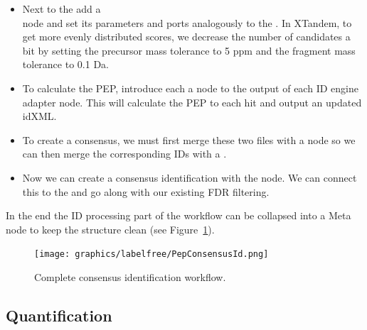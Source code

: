 \begin{itemize}
\item
Next to the  add a  \\
 node and set its parameters and ports analogously to the . In XTandem, to get more evenly distributed scores, we decrease the number of candidates a bit by setting the precursor mass tolerance to 5 ppm and the fragment mass tolerance to 0.1 Da.
\item
To calculate the PEP, introduce each a   node to the output of each ID engine adapter node.
This will calculate the PEP to each hit and output an updated idXML.
\item
To create a consensus, we must first merge these two files with a  node  so we can then merge the corresponding IDs with a  .
\item
Now we can create a consensus identification with the   node.
We can connect this to the  and go along with our existing FDR filtering.
\end{itemize}

\noindent In the end the ID processing part of the workflow can be collapsed into a Meta node to keep the structure clean (see Figure~\ref{fig:consensusid}).

\begin{figure}[htbp]
  \centering
  \texttt{[image: graphics/labelfree/PepConsensusId.png]}
  \caption{Complete consensus identification workflow.}
  \label{fig:consensusid}
\end{figure}

\newpage
\subsection{Quantification}
\label{Labelfree_Quantification}

